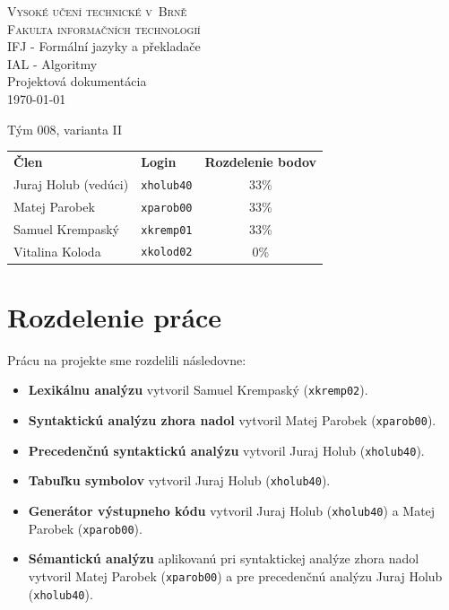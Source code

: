 \documentclass[a4paper, 11pt]{article}
\author{Juraj Holub}
\date{}
\begin{document}
\begin{titlepage}
\begin{center}
	\Huge
	\textsc{\Huge{Vysoké učení technické v~Brně} \\
	\huge{ Fakulta informačních technologií}} \\
	\LARGE{IFJ - Formální jazyky a překladače} \\
	\LARGE{IAL - Algoritmy} \\
	\Huge{Projektová dokumentácia} \\
	\Large{\today}
	\setlength{\parindent}{0.3em}

	{\Large Tým 008, varianta II} \\
	
\begin{table}[H]
	\Large
	\centering
	\begin{tabular}{llc}
		\textbf{Člen}        & \textbf{Login} & \textbf{Rozdelenie bodov} \\
		Juraj Holub (vedúci) & \texttt{xholub40}       & 33\%                      \\
		Matej Parobek        & \texttt{xparob00}       & 33\%                      \\
		Samuel Krempaský      & \texttt{xkremp01}      & 33\%                      \\
		Vitalina Koloda      & \texttt{xkolod02}       & 0\%                      
	\end{tabular}
\end{table}
		
\end{center}
\end{titlepage}

{\hypersetup{hidelinks}\tableofcontents}
\newpage

\section{Rozdelenie práce}

Prácu na projekte sme rozdelili následovne:
\begin{itemize}
	\item{\textbf{Lexikálnu analýzu} vytvoril Samuel Krempaský (\texttt{xkremp02}).}
	\item{\textbf{Syntaktickú analýzu zhora nadol} vytvoril Matej Parobek (\texttt{xparob00}).}
	\item{\textbf{Precedenčnú syntaktickú analýzu} vytvoril Juraj Holub (\texttt{xholub40}).}
	\item{\textbf{Tabuľku symbolov} vytvoril Juraj Holub (\texttt{xholub40}).}
	\item{\textbf{Generátor výstupneho kódu} vytvoril Juraj Holub (\texttt{xholub40}) a Matej Parobek (\texttt{xparob00}).}
	\item{\textbf{Sémantickú analýzu} aplikovanú pri syntaktickej analýze zhora nadol vytvoril Matej Parobek (\texttt{xparob00}) a pre precedenčnú analýzu Juraj Holub (\texttt{xholub40}).}
\end{itemize}
\end{document}
